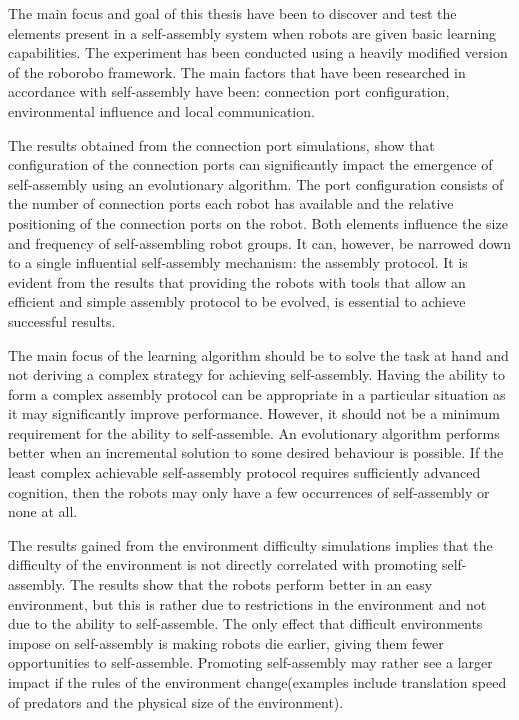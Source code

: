 The main focus and goal of this thesis have been to discover and test the elements present in a self-assembly system when robots are given basic learning capabilities.
The experiment has been conducted using a heavily modified version of the roborobo framework.
The main factors that have been researched in accordance with self-assembly have been: connection port configuration, environmental influence and local communication.

The results obtained from the connection port simulations, show that configuration of the connection ports can significantly impact the emergence of self-assembly using an evolutionary algorithm.
The port configuration consists of the number of connection ports each robot has available and the relative positioning of the connection ports on the robot.
Both elements influence the size and frequency of self-assembling robot groups.
It can, however, be narrowed down to a single influential self-assembly mechanism: the assembly protocol.
It is evident from the results that providing the robots with tools that allow an efficient and simple assembly protocol to be evolved, is essential to achieve successful results.

The main focus of the learning algorithm should be to solve the task at hand and not deriving a complex strategy for achieving self-assembly.
Having the ability to form a complex assembly protocol can be appropriate in a particular situation as it may significantly improve performance.
However, it should not be a minimum requirement for the ability to self-assemble.
An evolutionary algorithm performs better when an incremental solution to some desired behaviour is possible.
If the least complex achievable self-assembly protocol requires sufficiently advanced cognition, then the robots may only have a few occurrences of self-assembly or none at all.

The results gained from the environment difficulty simulations implies that the difficulty of the environment is not directly correlated with promoting self-assembly.
The results show that the robots perform better in an easy environment, but this is rather due to restrictions in the environment and not due to the ability to self-assemble.
The only effect that difficult environments impose on self-assembly is making robots die earlier, giving them fewer opportunities to self-assemble.
Promoting self-assembly may rather see a larger impact if the rules of the environment change(examples include translation speed of predators and the physical size of the environment).

